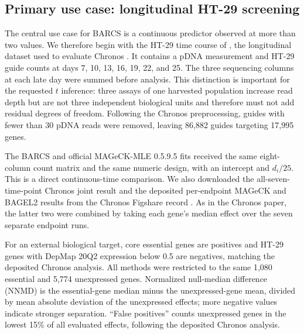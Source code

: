 \subsection{Primary use case: longitudinal HT-29 screening}

The central use case for BARCS is a continuous predictor observed at more than
two values.  We therefore begin with the HT-29 time course of
\citet{tzelepis2016dropout}, the longitudinal dataset used to evaluate
Chronos \citep{dempster2021chronos}.  It contains a pDNA measurement and HT-29
guide counts at days 7, 10, 13, 16, 19, 22, and 25.
The three sequencing columns at each late day were summed before analysis.
This distinction is important for the requested $t$ inference: three assays of
one harvested population increase read depth but are not three independent
biological units and therefore must not add residual degrees of freedom.
Following the Chronos preprocessing, guides with fewer than 30 pDNA reads were
removed, leaving 86,882 guides targeting 17,995 genes.

The BARCS and official MAGeCK-MLE 0.5.9.5 fits received the same
eight-column count matrix and the same numeric design, with an intercept and
$d_i/25$.  This is a direct continuous-time comparison.  We also downloaded
the all-seven-time-point Chronos joint result and the deposited per-endpoint
MAGeCK and BAGEL2 results from the Chronos Figshare record
\citep{chronosfigshare2021}.  As in the Chronos paper, the latter two were
combined by taking each gene's median effect over the seven separate endpoint
runs.

For an external biological target, core essential genes are positives and
HT-29 genes with DepMap 20Q2 expression below 0.5 are negatives, matching the
deposited Chronos analysis.  All methods were
restricted to the same 1,080 essential and 5,774 unexpressed genes.
Normalized null-median difference (NNMD) is the essential-gene median minus
the unexpressed-gene mean, divided by mean absolute deviation of the
unexpressed effects; more negative values indicate stronger separation.
``False positives'' counts unexpressed genes in the lowest 15\% of all
evaluated effects, following the deposited Chronos analysis.

